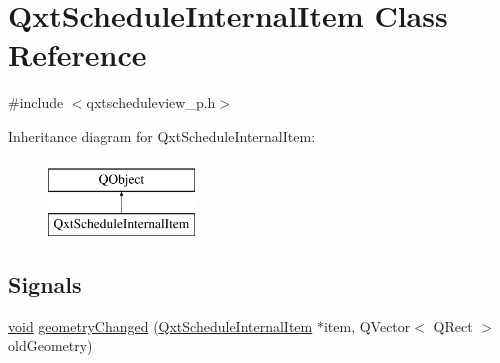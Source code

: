 \hypertarget{class_qxt_schedule_internal_item}{\section{Qxt\-Schedule\-Internal\-Item Class Reference}
\label{class_qxt_schedule_internal_item}
}


{\ttfamily \#include $<$qxtscheduleview\-\_\-p.\-h$>$}

Inheritance diagram for Qxt\-Schedule\-Internal\-Item\-:\begin{figure}[H]
\begin{center}
\leavevmode
\includegraphics[height=2.000000cm]{class_qxt_schedule_internal_item}
\end{center}
\end{figure}
\subsection*{Signals}
\begin{DoxyCompactItemize}
\item 
\hyperlink{group___u_a_v_objects_plugin_ga444cf2ff3f0ecbe028adce838d373f5c}{void} \hyperlink{class_qxt_schedule_internal_item_a2a1a8924b81b37649f1aebc44dc06895}{geometry\-Changed} (\hyperlink{class_qxt_schedule_internal_item}{Qxt\-Schedule\-Internal\-Item} $\ast$item, Q\-Vector$<$ Q\-Rect $>$ old\-Geometry)
\end{DoxyCompactItemize}
